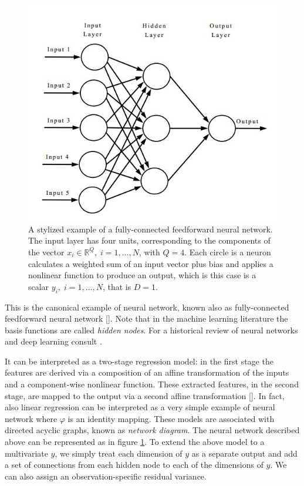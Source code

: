 \begin{figure}
    \centering
    \includegraphics[scale=0.4]{images/nn.jpg}
    \caption{A stylized example of a fully-connected feedforward neural network. The input layer has four units, corresponding to the components of the vector $x_i \in \mathbb{R}^Q, \; i = 1,\dots, N$, with $Q = 4$. Each circle is a neuron calculates a weighted sum of an input vector plus bias and applies a nonlinear function to produce an output, which is this case is a scalar $y_i, \; i=1,\dots,N$, that is $D = 1$.}
    \label{fig:neural_network}
\end{figure}
This is the canonical example of neural network, known also as fully-connected feedforward neural network [\cite{Rosenblatt1958, Goodfellow-et-al-2016}]. Note that in the machine learning literature the basis functions are called \textit{hidden nodes}. For a historical review of neural networks and deep learning consult \cite{Schmidhuber2015}. 

It can be interpreted as a two-stage regression model: in the first stage the features are derived via a composition of an affine transformation of the inputs and a component-wise nonlinear function. These extracted features, in the second stage, are mapped to the output via a second affine transformation [\cite{ESL}]. In fact, also linear regression can be interpreted as a very simple example of neural network where $\varphi$ is an identity mapping. These models are associated with directed acyclic graphs, known as \textit{network diagram}. The neural network described above can be represented as in figure \ref{fig:neural_network}. To extend the above model to a multivariate $y$, we simply treat each dimension of $y$ as a separate output and add a set of connections from each hidden node to each of the dimensions of $y$. We can also assign an observation-specific residual variance.

